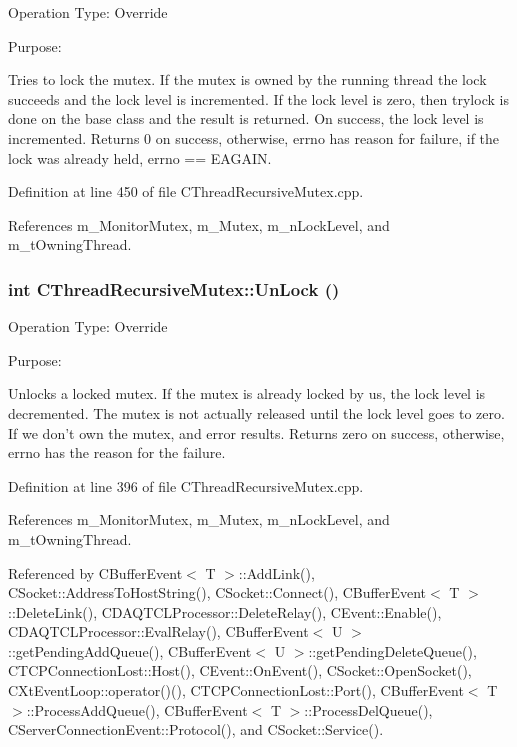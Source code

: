 Operation Type: Override

Purpose:

Tries to lock the mutex.  If the mutex is owned by the running thread the lock succeeds and the lock level is incremented. If the lock level is zero, then trylock is done on the base class and the result is returned. On success, the lock level is incremented. Returns 0 on success, otherwise, errno has reason for failure, if the lock was already held, errno == EAGAIN. 

Definition at line 450 of file CThread\-Recursive\-Mutex.cpp.

References m\_\-Monitor\-Mutex, m\_\-Mutex, m\_\-n\-Lock\-Level, and m\_\-t\-Owning\-Thread.
\subsubsection{\setlength{\rightskip}{0pt plus 5cm}int CThread\-Recursive\-Mutex::Un\-Lock ()}\label{classCThreadRecursiveMutex_a7}


Operation Type: Override

Purpose:

Unlocks a locked mutex. If the mutex is already locked by us, the lock level is decremented. The mutex is not actually released until the lock level goes to zero. If we don't own the mutex, and error results. Returns zero on success, otherwise, errno has the reason for the failure. 

Definition at line 396 of file CThread\-Recursive\-Mutex.cpp.

References m\_\-Monitor\-Mutex, m\_\-Mutex, m\_\-n\-Lock\-Level, and m\_\-t\-Owning\-Thread.

Referenced by CBuffer\-Event$<$ T $>$::Add\-Link(), CSocket::Address\-To\-Host\-String(), CSocket::Connect(), CBuffer\-Event$<$ T $>$::Delete\-Link(), CDAQTCLProcessor::Delete\-Relay(), CEvent::Enable(), CDAQTCLProcessor::Eval\-Relay(), CBuffer\-Event$<$ U $>$::get\-Pending\-Add\-Queue(), CBuffer\-Event$<$ U $>$::get\-Pending\-Delete\-Queue(), CTCPConnection\-Lost::Host(), CEvent::On\-Event(), CSocket::Open\-Socket(), CXt\-Event\-Loop::operator()(), CTCPConnection\-Lost::Port(), CBuffer\-Event$<$ T $>$::Process\-Add\-Queue(), CBuffer\-Event$<$ T $>$::Process\-Del\-Queue(), CServer\-Connection\-Event::Protocol(), and CSocket::Service().
